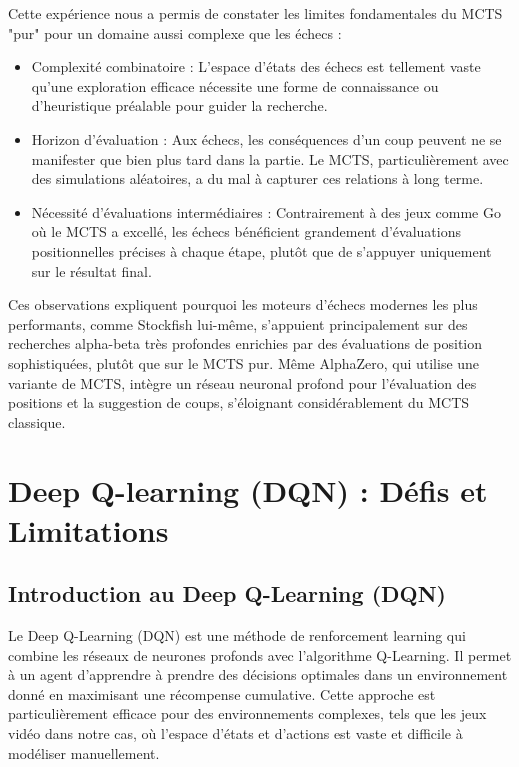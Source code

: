 \documentclass{article}
\begin{document}
    \quad Cette expérience nous a permis de constater les limites fondamentales du MCTS "pur" pour un domaine aussi complexe que les échecs :
    \begin{itemize} 
        \item Complexité combinatoire : L'espace d'états des échecs est tellement vaste qu'une exploration efficace nécessite une forme de connaissance ou d'heuristique préalable pour guider la recherche.
        \item Horizon d'évaluation : Aux échecs, les conséquences d'un coup peuvent ne se manifester que bien plus tard dans la partie. Le MCTS, particulièrement avec des simulations aléatoires, a du mal à capturer ces relations à long terme.
        \item Nécessité d'évaluations intermédiaires : Contrairement à des jeux comme Go où le MCTS a excellé, les échecs bénéficient grandement d'évaluations positionnelles précises à chaque étape, plutôt que de s'appuyer uniquement sur le résultat final.
    \end{itemize}

    Ces observations expliquent pourquoi les moteurs d'échecs modernes les plus performants, comme Stockfish lui-même, s'appuient principalement sur des recherches alpha-beta très profondes enrichies par des évaluations de position sophistiquées, plutôt que sur le MCTS pur. Même AlphaZero, qui utilise une variante de MCTS, intègre un réseau neuronal profond pour l'évaluation des positions et la suggestion de coups, s'éloignant considérablement du MCTS classique.\\

\clearpage

\section{Deep Q-learning (DQN) : Défis et Limitations}

\subsection{Introduction au Deep Q-Learning (DQN)}

\quad Le Deep Q-Learning (DQN) est une méthode de renforcement learning qui combine les réseaux de neurones profonds avec l'algorithme Q-Learning. Il permet à un agent d'apprendre à prendre des décisions optimales dans un environnement donné en maximisant une récompense cumulative. Cette approche est particulièrement efficace pour des environnements complexes, tels que les jeux vidéo dans notre cas, où l'espace d'états et d'actions est vaste et difficile à modéliser manuellement.\\
\end{document}
